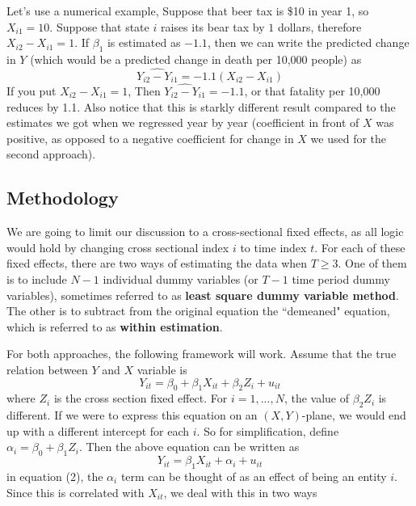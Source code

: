 \documentclass[12pt]{article}
\theoremstyle{definition}
\theoremstyle{property}
\theoremstyle{assumption}
\theoremstyle{example}
\theoremstyle{comment}
\begin{document}
Let's use a numerical example, Suppose that beer tax is \$10 in year 1, so $X_{i1}=10$. Suppose that state $i$ raises its bear tax by $1$ dollars, therefore $X_{i2}-X_{i1}=1$. If $\beta_1$ is estimated as  $-1.1$, then we can write the predicted change in $Y$ (which would be a predicted change in death per 10,000 people) as
\[
\widehat{Y_{i2}-Y_{i1}} = -1.1(X_{i2}-X_{i1})
\]
If you put  $X_{i2}-X_{i1}=1$, Then $\widehat{Y_{i2}-Y_{i1}} = -1.1$, or that fatality per 10,000 reduces by 1.1. Also notice that this is starkly different result compared to the estimates we got when we regressed year by year (coefficient in front of $X$ was positive, as opposed to a negative coefficient for change in $X$ we used for the second approach). \par\medskip
\subsection{Methodology}
We are going to limit our discussion to a cross-sectional fixed effects, as all logic would hold by changing cross sectional index $i$ to time index $t$. For each of these fixed effects, there are two ways of estimating the data when $T\geq 3$. One of them is to include $N-1$ individual dummy variables (or $T-1$ time period dummy variables), sometimes referred to as \textbf{least square dummy variable method}. The other is to subtract from the original equation the ``demeaned" equation, which is referred to as \textbf{within estimation}. \par\medskip
For both approaches, the following framework will work. Assume that the true relation between $Y$ and $X$ variable is 
\[
Y_{it}=\beta_0 + \beta_1X_{it}+\beta_2 Z_{i}+u_{it} \tag{1}
\]
where $Z_i$ is the cross section fixed effect. For $i=1,...,N$, the value of $\beta_2 Z_i$ is different. If we were to express this equation on an $(X,Y)$-plane, we would end up with a different intercept for each $i$. So for simplification, define $\alpha_i = \beta_0 + \beta_1Z_i$. Then the above equation can be written as
\[
Y_{it}=\beta_1X_{it}+\alpha_{i}+u_{it} \tag{2}
\]
in equation (2), the $\alpha_i$ term can be thought of as an effect of being an entity $i$. Since this is correlated with $X_{it}$, we deal with this in two ways
\end{document}
